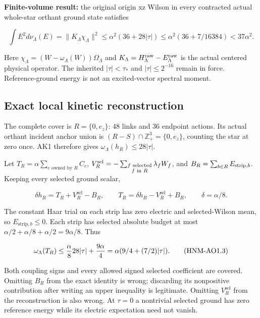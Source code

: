 \textbf{Finite-volume result:} the original origin xz Wilson in every contracted actual whole-star orthant ground state satisfies

\begin{equation}
\int E^2d\nu_\Lambda(E)=\|K_\Lambda\chi_\Lambda\|^2
\le\alpha^2(36+28|\tau|)
\le\alpha^2(36+7/16384)<37\alpha^2.\tag{HNM-AO1.1}
\label{r29:ao1:eq1}
\end{equation}

Here \(\chi_\Lambda=(W-\omega_\Lambda(W))\Omega_\Lambda\) and \(K_\Lambda=H^{\rm raw}_\Lambda-E^{\rm raw}_\Lambda\) is the actual centered physical operator. The inherited \(|\tau|<\tau_*\) and \(|\tau|\le 2^{-16}\) remain in force. Reference-ground energy is not an excited-vector spectral moment.

\hypertarget{r29-ao1-exact-local-kinetic-reconstruction}{%
\subsection{Exact local kinetic reconstruction}\label{r29:ao1:r29-ao1-exact-local-kinetic-reconstruction}}

The complete cover is \(R=\{0,e_z\}\): 48 links and 36 endpoint actions. Its actual orthant incident anchor union is \((R-S)\cap\mathbb Z_+^3=\{0,e_z\}\), counting the star at zero once. AK1 therefore gives \(\omega_\Lambda(h_R)\le 28|\tau|\).

Let \(T_R=\alpha\sum_{e\text{ owned by }R}C_e\), \(V_R^{\rm sel}=-\sum_{\substack{f\text{ selected}\\ f\text{ in }R}}\lambda_fW_f\), and \(B_R=\sum_{b\in R}E_{{\rm strip},b}\). Keeping every selected ground scalar,

\begin{equation}
\delta h_R=T_R+V_R^{\mathrm{sel}}-B_R,\qquad
T_R=\delta h_R-V_R^{\mathrm{sel}}+B_R,\qquad\delta=\alpha/8.\tag{HNM-AO1.2}
\label{r29:ao1:eq2}
\end{equation}

The constant Haar trial on each strip has zero electric and selected-Wilson mean, so \(E_{\mathrm{strip},b}\le 0\). Each strip has selected absolute budget at most \(\alpha/2+\alpha/8+\alpha/2=9\alpha/8\). Thus

\begin{equation}
\omega_\Lambda(T_R)\le{\alpha\over8}28|\tau|+{9\alpha\over4}
=\alpha(9/4+(7/2)|\tau|).\tag{HNM-AO1.3}
\label{r29:ao1:eq3}
\end{equation}

Both coupling signs and every allowed signed selected coefficient are covered. Omitting \(B_R\) from the exact identity is wrong; discarding its nonpositive contribution after writing an upper inequality is legitimate. Omitting \(V_{R}^{\mathrm{sel}}\) from the reconstruction is also wrong. At \(\tau=0\) a nontrivial selected ground has zero reference energy while its electric expectation need not vanish.

